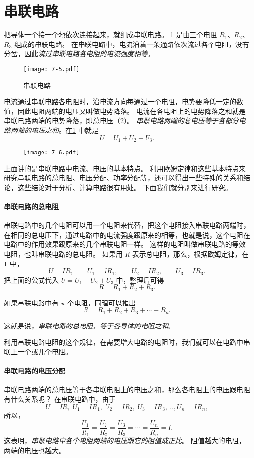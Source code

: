 \section{串联电路}
把导体一个接一个地依次连接起来，就组成串联电路。
\cref{fig:7-5} 是由三个电阻 $R_1$、$R_2$、$R_3$ 组成的串联电路。
在串联电路中，电流沿着一条通路依次流过各个电阻，没有分岔，因此\emph{流过串联电路各电阻的电流强度相等}。
\begin{figure}
  \texttt{[image: 7-5.pdf]}
  \caption{串联电路}\label{fig:7-5}
\end{figure}	

电流通过串联电路各电阻时，沿电流方向每通过一个电阻，电势要降低一定的数值，因此电阻两端的电压又叫做电势降落。
电流在各电阻上的电势降落之和就是串联电路两端的电势降落，即总电压（\cref{fig:7-6}）。
\emph{串联电路两端的总电压等于各部分电路两端的电压之和}。在\cref{fig:7-5} 中就是
\[U=U_1+U_2+U_3.\]
\begin{figure}
  \texttt{[image: 7-6.pdf]}
  \caption{}\label{fig:7-6}
\end{figure}	

上面讲的是串联电路中电流、电压的基本特点。
利用欧姆定律和这些基本特点来研究串联电路的总电阻、电压分配、功率分配等，还可以得出一些特殊的关系和结论，这些结论对于分析、计算电路很有用处。
下面我们就分别来进行研究。

\paragraph{串联电路的总电阻} 串联电路中的几个电阻可以用一个电阻来代替，把这个电阻接入串联电路两端时，在相同的总电压下，通过电路中的电流强度跟原来的相等，也就是说，这个电阻在电路中的作用效果跟原来的几个串联电阻一样。
这样的电阻叫做串联电路的等效电阻，也叫串联电路的总电阻。
如果用 $R$ 表示总电阻，那么，根据欧姆定律，在\cref{fig:7-5} 中，
\[U=IR,\qquad  U_1=IR_1,\qquad U_2=IR_2,\qquad U_3=IR_3.\]
把上面的公式代入 $U=U_1+U_2+U_3$ 中，整理后可得
\[R=R_1+R_2+R_3.\]

如果串联电路中有 $n$ 个电阻，同理可以推出 
\[R=R_1+R_2+R_3+\cdots+R_n.\]

这就是说，\emph{串联电路的总电阻，等于各导体的电阻之和}。

利用串联电路电阻的这个规律，在需要增大电路的电阻时，我们就可以在电路中串联上一个或几个电阻。

\paragraph{串联电路的电压分配} 串联电路两端的总电压等于各串联电阻上的电压之和，那么各电阻上的电压跟电阻有什么关系呢？
在串联电路中，由于
\[U=IR,\;  U_1=IR_1,\; U_2=IR_2,\; U_3=IR_3,\ldots, U_n=IR_n,\]
所以，
\[\frac{U_1}{R_1}=\frac{U_2}{R_2}=\frac{U_3}{R_3}=\cdots=\frac{U_n}{R_n}=I.\]
这表明，\emph{串联电路中各个电阻两端的电压跟它的阻值成正比}。
阻值越大的电阻，两端的电压也越大。

